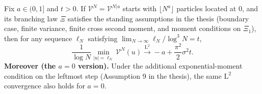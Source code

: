 \begin{theorem}[Theorem 1.1]
Fix $a\in(0,1]$ and $t>0$. If $\mathcal V^N=\mathcal V^{N|a}$ starts with $\lfloor N^a\rfloor$ particles located at $0$, and its branching law $\Xi$ satisfies the standing assumptions in the thesis (boundary case, finite variance, finite cross second moment, and moment conditions on $\Xi_1$), then for any sequence $\ell_N$ satisfying $\lim_{N\to\infty}\ell_N/\log^3N=t$,
\[
    \frac 1{\log N}\min_{|u|=\ell_N}\mathcal V^N(u)
    \xrightarrow{\mathrm L^2}
    -a+\frac{\pi^2}{2}\sigma^2 t.
\]
\vspace{1mm}
 \textbf{Moreover (the $a=0$ version).} Under the additional exponential-moment condition on the leftmost step (Assumption 9 in the thesis), the same $\mathrm L^2$ convergence also holds for $a=0$.
\end{theorem}
